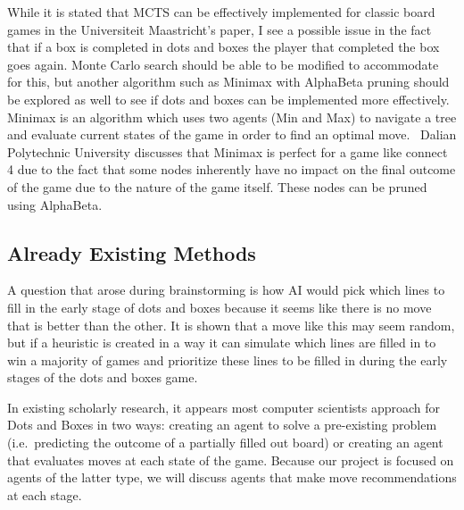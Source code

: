 \documentclass[12pt]{article}
\begin{document}
    While it is stated that MCTS can be effectively implemented for classic board games in the Universiteit Maastricht's paper, I see a possible issue in the fact that if a box is completed in dots and boxes the player that completed the box goes again. Monte Carlo search should be able to be modified to accommodate for this, but another algorithm such as Minimax with AlphaBeta pruning should be explored as well to see if dots and boxes can be implemented more effectively. Minimax is an algorithm which uses two agents (Min and Max) to navigate a tree and evaluate current states of the game in order to find an optimal move.~\cite{Minimax} Dalian Polytechnic University discusses that Minimax is perfect for a game like connect 4 due to the fact that some nodes inherently have no impact on the final outcome of the game due to the nature of the game itself. These nodes can be pruned using AlphaBeta. 
    
    \subsection{Already Existing Methods}
    
    A question that arose during brainstorming is how AI would pick which lines to fill in the early stage of dots and boxes because it seems like there is no move that is better than the other. It is shown that a move like this may seem random, but if a heuristic is created in a way it can simulate which lines are filled in to win a majority of games and prioritize these lines to be filled in during the early stages of the dots and boxes game.~\cite{Minimax}
           
    In existing scholarly research, it appears most computer scientists approach for Dots and Boxes in two ways: creating an agent to solve a pre-existing problem (i.e.\ predicting the outcome of a partially filled out board) or creating an agent that evaluates moves at each state of the game. Because our project is focused on agents of the latter type, we will discuss agents that make move recommendations at each stage. 
        
\end{document}
